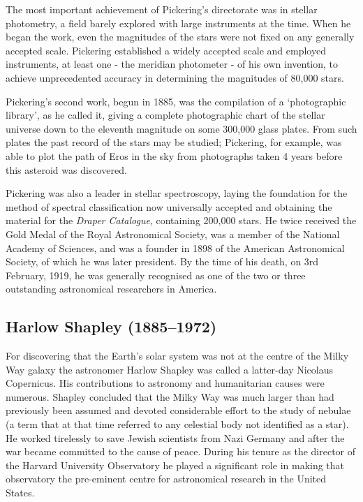 The most important achievement of Pickering's directorate was in stellar photometry, a field barely explored with large instruments at the time. When he began the work, even the magnitudes of the stars were not fixed on any generally accepted scale. Pickering established a widely accepted scale and employed instruments, at least one - the meridian photometer - of his own invention, to achieve unprecedented accuracy in determining the magnitudes of 80,000 stars.

Pickering's second work, begun in 1885, was the compilation of a ‘photographic library’, as he called it, giving a complete photographic chart of the stellar universe down to the eleventh magnitude on some 300,000 glass plates. From such plates the past record of the stars may be studied; Pickering, for example, was able to plot the path of Eros in the sky from photographs taken 4 years before this asteroid was discovered.

Pickering was also a leader in stellar spectroscopy, laying the foundation for the method of spectral classification now universally accepted and obtaining the material for the \textit{Draper Catalogue}, containing 200,000 stars. He twice received the Gold Medal of the Royal Astronomical Society, was a member of the National Academy of Sciences, and was a founder in 1898 of the American Astronomical Society, of which he was later president. By the time of his death, on 3rd February, 1919, he was generally recognised as one of the two or three outstanding astronomical researchers in America.

\subsection[Harlow \scshape{Shapley}]{Harlow Shapley (1885--1972)}\label{bio:shapley}
For discovering that the Earth's solar system was not at the centre of the Milky Way galaxy the astronomer Harlow Shapley was called a latter-day Nicolaus Copernicus. His contributions to astronomy and humanitarian causes were numerous. Shapley concluded that the Milky Way was much larger than had previously been assumed and devoted considerable effort to the study of nebulae (a term that at that time referred to any celestial body not identified as a star). He worked tirelessly to save Jewish scientists from Nazi Germany and after the war became committed to the cause of peace. During his tenure as the director of the Harvard University Observatory he played a significant role in making that observatory the pre-eminent centre for astronomical research in the United States.

